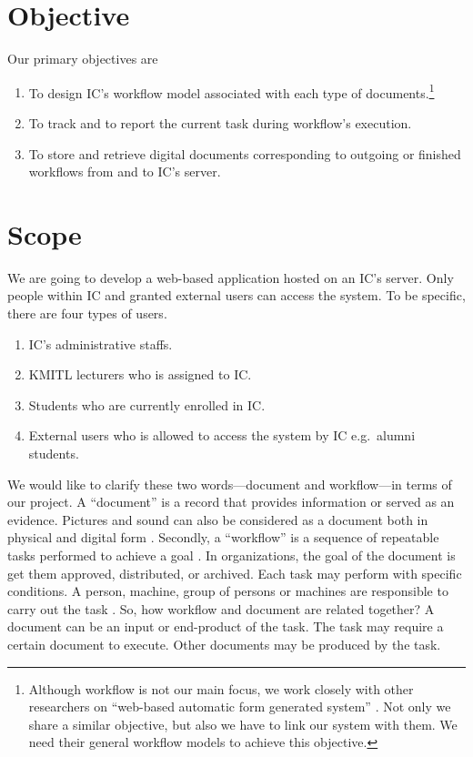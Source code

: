 \section{Objective}
Our primary objectives are
\begin{enumerate}
\item To design IC's workflow model associated with each type of documents.\footnote{
	Although workflow is not our main focus, we work closely with other researchers on \enquote{web-based automatic form generated system} \cite{web-based-form}.
	Not only we share a similar objective, but also we have to link our system with them.
	We need their general workflow models to achieve this objective.
	}
\item To track and to report the current task during workflow's execution.
\item To store and retrieve digital documents corresponding to outgoing or finished workflows from and to IC's server.
\end{enumerate}

\section{Scope}
We are going to develop a web-based application hosted on an IC's server.
Only people within IC and granted external users can access the system.
To be specific, there are four types of users.
\begin{enumerate}
\item IC's administrative staffs.
\item KMITL lecturers who is assigned to IC.
\item Students who are currently enrolled in IC.
\item External users who is allowed to access the system by IC e.g.\ alumni students.
\end{enumerate}

We would like to clarify these two words---document and workflow---in terms of our project. %
A \enquote{document} is a record that provides information or served as an evidence. 
Pictures and sound can also be considered as a document both in physical and digital form \cite{oxdict:document,whatis:document}. 
Secondly, a \enquote{workflow} is a sequence of repeatable tasks performed to achieve a goal \cite{Jablonski:1996:WMM}. 
In organizations, the goal of the document is get them approved, distributed, or archived.
Each task may perform with specific conditions.
A person, machine, group of persons or machines are responsible to carry out the task \cite{wfMangement}. 
So, how workflow and document are related together?
A document can be an input or end-product of the task.
The task may require a certain document to execute.
Other documents may be produced by the task.

